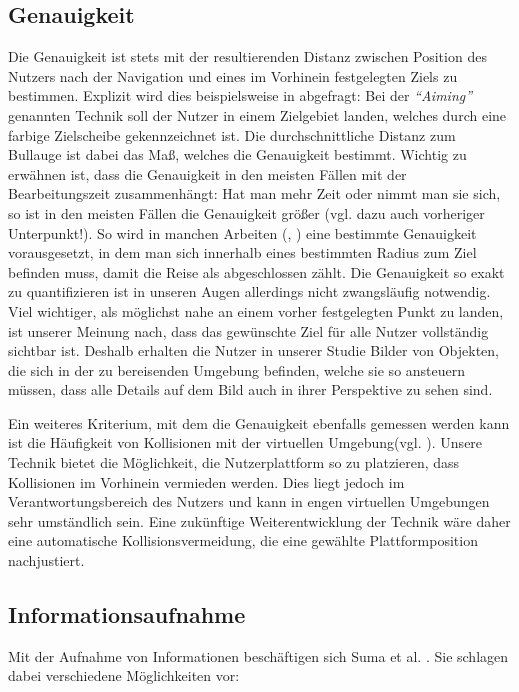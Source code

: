 \subsection{Genauigkeit}
Die Genauigkeit ist stets mit der resultierenden Distanz zwischen Position des Nutzers nach der Navigation und eines im Vorhinein festgelegten Ziels zu bestimmen. 
Explizit wird dies beispielsweise in \cite{Krekhov2018GulliVR} abgefragt: Bei der \textit{“Aiming”} genannten Technik soll der Nutzer in einem Zielgebiet landen, welches durch eine farbige Zielscheibe gekennzeichnet ist. Die durchschnittliche Distanz zum Bullauge ist dabei das Maß, welches die Genauigkeit bestimmt.
Wichtig zu erwähnen ist, dass die Genauigkeit in den meisten Fällen mit der Bearbeitungszeit zusammenhängt: Hat man mehr Zeit oder nimmt man sie sich, so ist in den meisten Fällen die Genauigkeit größer (vgl. dazu auch vorheriger Unterpunkt!).
So wird in manchen Arbeiten (\cite{BowmanTestbedTechniques}, \cite{3_Pierce1997}) eine bestimmte Genauigkeit vorausgesetzt, in dem man sich innerhalb eines bestimmten Radius zum Ziel befinden muss, damit die Reise als abgeschlossen zählt.
Die Genauigkeit so exakt zu quantifizieren ist in unseren Augen allerdings nicht zwangsläufig notwendig. 
Viel wichtiger, als möglichst nahe an einem vorher festgelegten Punkt zu landen, ist unserer Meinung nach, dass das gewünschte Ziel für alle Nutzer vollständig sichtbar ist. 
Deshalb erhalten die Nutzer in unserer Studie Bilder von Objekten, die sich in der zu bereisenden Umgebung befinden, welche sie so ansteuern müssen, dass alle Details auf dem Bild auch in ihrer Perspektive zu sehen sind.

Ein weiteres Kriterium, mit dem die Genauigkeit ebenfalls gemessen werden kann ist die Häufigkeit von Kollisionen mit der virtuellen Umgebung(vgl. \cite{Suma2010EvaluationEnvironments}). Unsere Technik bietet die Möglichkeit, die Nutzerplattform so zu platzieren, dass Kollisionen im Vorhinein vermieden werden. Dies liegt jedoch im Verantwortungsbereich des Nutzers und kann in engen virtuellen Umgebungen sehr umständlich sein. Eine zukünftige Weiterentwicklung der Technik wäre daher eine automatische Kollisionsvermeidung, die eine gewählte Plattformposition nachjustiert.


\subsection{Informationsaufnahme}
Mit der Aufnahme von Informationen beschäftigen sich Suma et al. \cite{Suma2010EvaluationEnvironments}. Sie schlagen dabei verschiedene Möglichkeiten vor:


